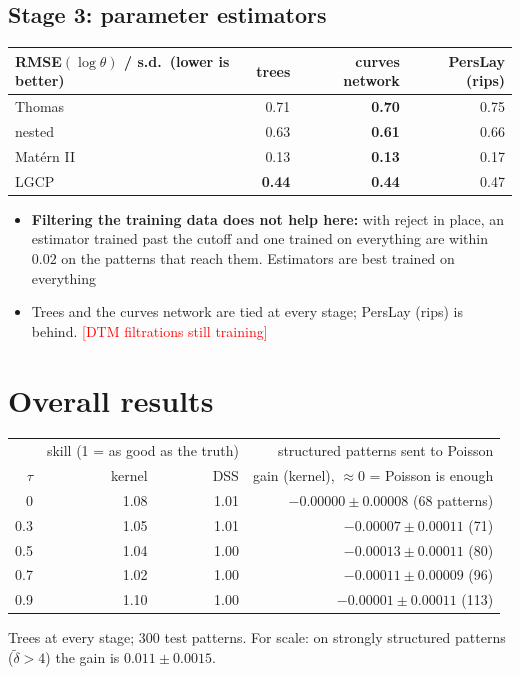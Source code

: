 \documentclass[11pt]{article}
\newcommand{\dt}{\tilde\delta}
\newcommand{\pending}[1]{\textcolor{red}{[#1]}}
\begin{document}
\subsection*{Stage 3: parameter estimators}
\begin{center}
\begin{tabular}{@{}lrrr@{}}
\toprule
RMSE$(\log\theta)$ / s.d.\ (lower is better) & trees & curves network & PersLay (rips) \\
\midrule
Thomas      & 0.71 & \textbf{0.70} & 0.75 \\
nested      & 0.63 & \textbf{0.61} & 0.66 \\
Mat\'ern II & 0.13 & \textbf{0.13} & 0.17 \\
LGCP        & \textbf{0.44} & \textbf{0.44} & 0.47 \\
\bottomrule
\end{tabular}
\end{center}
\begin{itemize}
  \item \textbf{Filtering the training data does not help here:} with reject in place, an estimator trained past the cutoff and one trained on everything are within $0.02$ on the patterns that reach them. Estimators are best trained on everything
  \item Trees and the curves network are tied at every stage; PersLay (rips) is behind. \pending{DTM filtrations still training}
\end{itemize}

\section{Overall results}

\begin{center}
\begin{tabular}{@{}rrrr@{}}
\toprule
& \multicolumn{2}{c}{skill (1 = as good as the truth)} & structured patterns sent to Poisson \\
$\tau$ & kernel & DSS & gain (kernel), $\approx 0$ = Poisson is enough \\
\midrule
0   & 1.08 & 1.01 & $-0.00000 \pm 0.00008$ \quad (68 patterns) \\
0.3 & 1.05 & 1.01 & $-0.00007 \pm 0.00011$ \quad (71) \\
0.5 & 1.04 & 1.00 & $-0.00013 \pm 0.00011$ \quad (80) \\
0.7 & 1.02 & 1.00 & $-0.00011 \pm 0.00009$ \quad (96) \\
0.9 & 1.10 & 1.00 & $-0.00001 \pm 0.00011$ \quad (113) \\
\bottomrule
\end{tabular}
\end{center}
{\small Trees at every stage; 300 test patterns. For scale: on strongly structured patterns ($\dt>4$) the gain is $0.011\pm0.0015$.}
\end{document}
